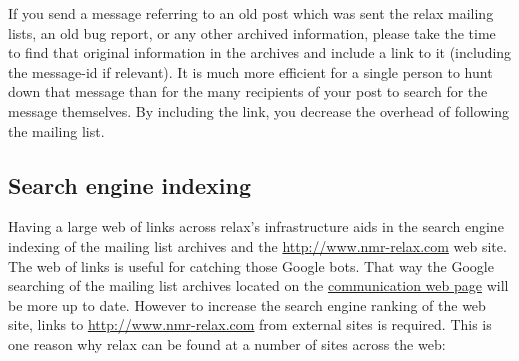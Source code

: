 If you send a message referring to an old post which was sent the relax mailing lists, an old bug report, or any other archived information, please take the time to find that original information in the archives and include a link to it (including the message-id if relevant).
It is much more efficient for a single person to hunt down that message than for the many recipients of your post to search for the message themselves.
By including the link, you decrease the overhead of following the mailing list.



\subsection{Search engine indexing}

Having a large web of links across relax's infrastructure aids in the search engine indexing of the mailing list archives and the \href{http://www.nmr-relax.com}{http://www.nmr-relax.com} web site.
The web of links is useful for catching those Google bots.
That way the Google searching of the mailing list archives located on the \href{http://www.nmr-relax.com/communication.html}{communication web page} will be more up to date.
However to increase the search engine ranking of the web site, links to \href{http://www.nmr-relax.com}{http://www.nmr-relax.com} from external sites is required.
This is one reason why relax can be found at a number of sites across the web:
